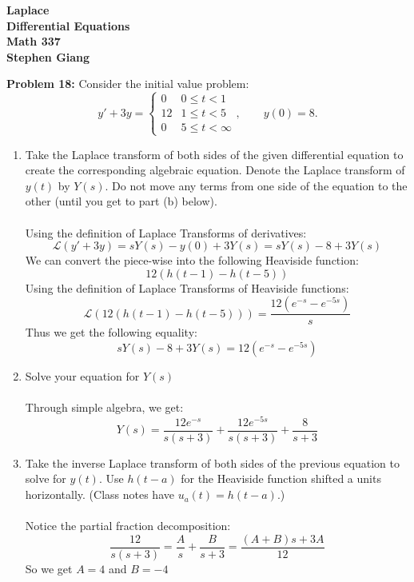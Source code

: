 \documentclass[12pt]{article}
\begin{document}
	
	\begin{center}
		\textbf{Laplace} \\
		\textbf{Differential Equations} \\
		\textbf{Math 337} \\
		\textbf{Stephen Giang} \\
	\end{center}

\noindent \textbf{Problem 18: }Consider the initial value problem:
	$$
	y' + 3y = 
	\begin{cases}
	0 & 0 \leq t  < 1 \\
	12 & 1 \leq t < 5 \\
	0 & 5 \leq t < \infty
	\end{cases},
	\qquad y(0) = 8.
	$$
	
	\begin{enumerate}[label = (\alph*)]
		\item Take the Laplace transform of both sides of the given differential equation to create the corresponding algebraic equation. Denote the Laplace transform of $y(t)$ by $Y(s)$. Do not move any terms from one side of the equation to the other (until you get to part (b) below).
		\\ \\
		Using the definition of Laplace Transforms of derivatives:
			$$
			\mathcal{L}(y' + 3y) = sY(s) - y(0) + 3Y(s) = sY(s) - 8 + 3Y(s)
			$$
		We can convert the piece-wise into the following Heaviside function:
			$$
			12(h(t-1) - h(t-5))
			$$
		Using the definition of Laplace Transforms of Heaviside functions:
			$$
			\mathcal{L}(12(h(t-1) - h(t-5))) = \frac{12(e^{-s} - e^{-5s})}{s}
			$$ 
		Thus we get the following equality:
			$$
			sY(s) - 8 + 3Y(s) = 12(e^{-s} - e^{-5s})
			$$
		\item Solve your equation for $Y(s)$
		\\ \\
		Through simple algebra, we get:
			$$
			Y(s) = \frac{12e^{-s}}{s(s+3)} + \frac{12e^{-5s}}{s(s+3)} + \frac{8}{s+3}
			$$
		\newpage
		\item Take the inverse Laplace transform of both sides of the previous equation to solve for $y(t)$. Use $h(t-a)$ for the Heaviside function shifted a units horizontally. (Class notes have $u_a(t) = h(t-a)$.)
		\\ \\
		Notice the partial fraction decomposition:
			$$
			\frac{12}{s(s+3)} = \frac{A}{s} + \frac{B}{s+3} = \frac{(A+B)s + 3A}{12}
			$$
		So we get $A = 4$ and $B = -4$

\end{enumerate}
\end{document}
